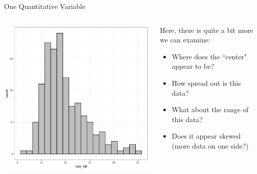 \documentclass{beamer}
\begin{document}
\begin{frame}{One Quantitative Variable}
\begin{columns}

  \begin{column}{0.45\textwidth}
	\begin{center}
	\includegraphics[scale=0.35]{img/bill_bin_20.png}
	\end{center}
  \end{column}
  \begin{column}{0.45\textwidth}
	Here, there is quite a bit more we can examine:
	\begin{itemize}
	\item Where does the ``center" appear to be?
	\item How spread out is this data?
	\item What about the range of this data?
	\item Does it appear skewed (more data on one side?)
	\end{itemize}
  \end{column}

\end{columns}
\end{frame}
\end{document}
